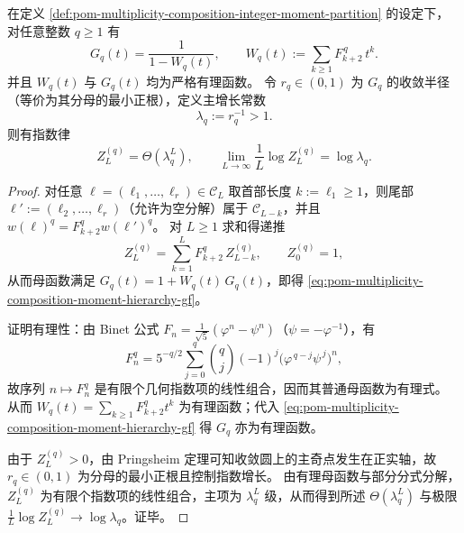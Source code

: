 \begin{proposition}[整阶矩配分函数的有理性与主指数增长常数]\label{prop:pom-multiplicity-composition-moment-hierarchy-rational-growth}
在定义 \ref{def:pom-multiplicity-composition-integer-moment-partition} 的设定下，对任意整数 \(q\ge 1\) 有
\begin{equation}\label{eq:pom-multiplicity-composition-moment-hierarchy-gf}
\boxed{\;
G_q(t)=\frac{1}{1-W_q(t)},
\qquad
W_q(t):=\sum_{k\ge 1}F_{k+2}^{\,q}\,t^k.\;}
\end{equation}
并且 \(W_q(t)\) 与 \(G_q(t)\) 均为严格有理函数。
令 \(r_q\in(0,1)\) 为 \(G_q\) 的收敛半径（等价为其分母的最小正根），定义主增长常数
\[
\boxed{\;\lambda_q:=r_q^{-1}>1.\;}
\]
则有指数律
\[
\boxed{\;Z_L^{(q)}=\Theta(\lambda_q^{L}),\qquad
\lim_{L\to\infty}\frac1L\log Z_L^{(q)}=\log\lambda_q.\;}
\]
\end{proposition}
\begin{proof}
对任意 \(\boldsymbol{\ell}=(\ell_1,\dots,\ell_r)\in\mathcal{C}_L\) 取首部长度 \(k:=\ell_1\ge 1\)，则尾部 \(\boldsymbol{\ell}':=(\ell_2,\dots,\ell_r)\)（允许为空分解）属于 \(\mathcal{C}_{L-k}\)，并且
\(
w(\boldsymbol{\ell})^{q}=F_{k+2}^{q}w(\boldsymbol{\ell}')^{q}
\)。
对 \(L\ge 1\) 求和得递推
\[
Z_L^{(q)}=\sum_{k=1}^{L}F_{k+2}^{q}\,Z_{L-k}^{(q)},
\qquad Z_0^{(q)}=1,
\]
从而母函数满足
\(
G_q(t)=1+W_q(t)\,G_q(t)
\)，即得 \eqref{eq:pom-multiplicity-composition-moment-hierarchy-gf}。
\par
证明有理性：由 Binet 公式
\(
F_n=\frac{1}{\sqrt5}(\varphi^n-\psi^n)
\)（\(\psi=-\varphi^{-1}\)），有
\[
F_n^{q}=5^{-q/2}\sum_{j=0}^{q}\binom{q}{j}(-1)^j\bigl(\varphi^{\,q-j}\psi^{\,j}\bigr)^{n},
\]
故序列 \(n\mapsto F_n^{q}\) 是有限个几何指数项的线性组合，因而其普通母函数为有理式。
从而
\(
W_q(t)=\sum_{k\ge 1}F_{k+2}^{q}t^k
\)
为有理函数；代入 \eqref{eq:pom-multiplicity-composition-moment-hierarchy-gf} 得 \(G_q\) 亦为有理函数。
\par
由于 \(Z_L^{(q)}>0\)，由 Pringsheim 定理可知收敛圆上的主奇点发生在正实轴，故 \(r_q\in(0,1)\) 为分母的最小正根且控制指数增长。
由有理母函数与部分分式分解，\(Z_L^{(q)}\) 为有限个指数项的线性组合，主项为 \(\lambda_q^{L}\) 级，从而得到所述 \(\Theta(\lambda_q^L)\) 与极限 \(\frac1L\log Z_L^{(q)}\to\log\lambda_q\)。证毕。
\end{proof}

